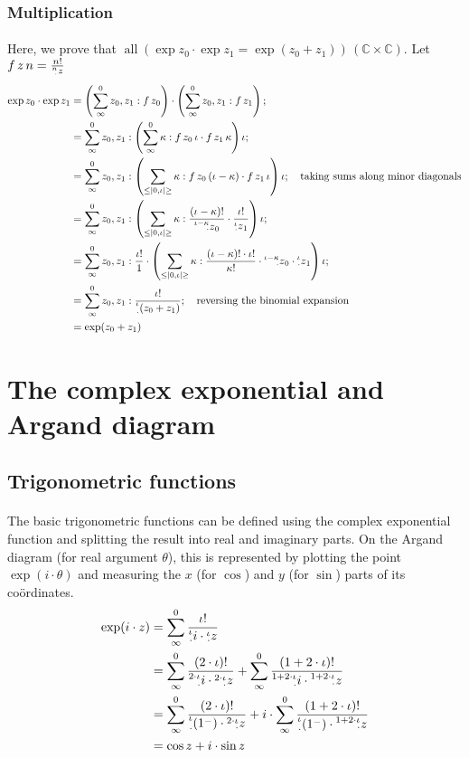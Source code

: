 \documentclass[11pt]{article}
\newcommand*\C{\ensuremath{\mathbb C}}
\newcommand*\id{\iota}
\newcommand*\cd{\cdot}
\newcommand*\prg{\paragraph}
\newcommand*\pt{\prescript}
\DeclareMathOperator{\all}{all}
\begin{document}
\subsubsection{Multiplication}
\prg{}Here, we prove that $\all(\exp z_0\cd\exp z_1=\exp(z_0+z_1))\,(\C\times\C)$. Let $f\,z\,n=\frac{n!}{\pt n\cd z}$
\[
\begin{aligned}
\exp z_0\cd\exp z_1&=\left(\sum^0_\infty z_0,z_1:f\,z_0\right)\cd\left(\sum^0_\infty z_0,z_1:f\,z_1\right); \\
                  &=\sum^0_\infty z_0,z_1:\left(\sum^0_\infty\kappa:f\,z_0\,\id\cd f\,z_1\,\kappa\right)\id; \\
                  &=\sum^0_\infty z_0,z_1:\left(\sum_{\leq|0,\id|\geq}\kappa:f\,z_0\,(\id-\kappa)\cd f\,z_1\,\id\right)\id;\quad\textrm{taking sums along minor diagonals}\\
                  &=\sum^0_\infty z_0,z_1:\left(\sum_{\leq|0,\id|\geq}\kappa:\frac{(\id-\kappa)!}{\pt{\id-\kappa}{\cd}z_0}\cd \frac{\id!}{\pt\id\cd z_1}\right)\id; \\
                  &=\sum^0_\infty z_0,z_1:\frac{\id!}{1}\cd\left(\sum_{\leq|0,\id|\geq}\kappa:\frac{(\id-\kappa)!\cd\id!}{\kappa!}\cd\pt{\id-\kappa}{\cd}z_0\cd\pt\id\cd z_1\right)\id; \\
                  &=\sum^0_\infty z_0,z_1:\frac{\id!}{\pt\id\cd(z_0+z_1)};\quad\textrm{reversing the binomial expansion} \\
                  &=\exp(z_0+z_1)
\end{aligned}
\]

\section{The complex exponential and Argand diagram}
\subsection{Trigonometric functions}
\prg{}The basic trigonometric functions can be defined using the complex exponential function and splitting the result into real and imaginary parts. On the Argand diagram (for real argument $\theta$), this is represented by plotting the point $\exp(i\cd\theta)$ and measuring the $x$ (for $\cos$) and $y$ (for $\sin$) parts of its co\"ordinates.
\[
\begin{aligned}
\exp(i\cd z)&=\sum^0_\infty\frac{\id!}{\pt\id\cd i\cd\pt\id\cd z} \\
&=\sum^0_\infty\frac{(2\cd\id)!}{\pt{2\cd\id}{\cd}i\cd\pt{2\cd\id}{\cd}z}+
  \sum^0_\infty\frac{(1+2\cd\id)!}{\pt{1+2\cd\id}{\cd}i\cd\pt{1+2\cd\id}{\cd}z} \\
&=\sum^0_\infty\frac{(2\cd\id)!}{\pt\id\cd(1^-)\cd\pt{2\cd\id}{\cd}z}+i\cd
  \sum^0_\infty\frac{(1+2\cd\id)!}{\pt\id\cd(1^-)\cd\pt{1+2\cd\id}{\cd}z} \\
&=\cos z+i\cd\sin z
\end{aligned}
\]
\end{document}
